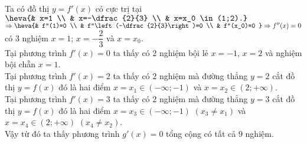 \begin{ex}
{			Ta có đồ thị $y=f'(x)$ có cực trị tại $\heva{& x=1 \\ & x=-\dfrac{2}{3} \\ & x=x_0 \in (1;2).}$\\
			$\Rightarrow \heva{& f''(1)=0 \\ & f''\left(-\dfrac{2}{3}\right)=0 \\ & f''(x_0)=0 } \Rightarrow f''(x)=0$ có $3$ nghiệm $x=1$; $x=-\dfrac{2}{3}$ và $x=x_0$.\\
			Tại phương trình $f'(x)=0$ ta thấy có $2$ nghiệm bội lẻ $x=-1$,  $x=2$ và nghiệm bội chẵn $x=1$.\\
			Tại phương trình $f'(x)=2$ ta thấy có $2$ nghiệm mà đường thẳng $y=2$ cắt đồ thị $y=f(x)$ đó là hai điểm $x=x_1 \in(-\infty ;-1)$ và $x=x_2 \in(2 ;+\infty)$.\\
			Tại phương trình $f'(x)=3$ ta thấy có $2$ nghiệm mà đường thẳng $y=3$ cắt đồ thị $y=f(x)$ đó là hai điểm $x=x_3 \in(-\infty ;-1)$ $(x_3\neq x_1)$ và $x=x_4 \in(2 ;+\infty)$ $(x_4\neq x_2)$.\\
			Vậy từ đó ta thấy phương trình $g'(x)=0$ tổng cộng có tất cả $9$ nghiệm.
		}
	\end{ex}
